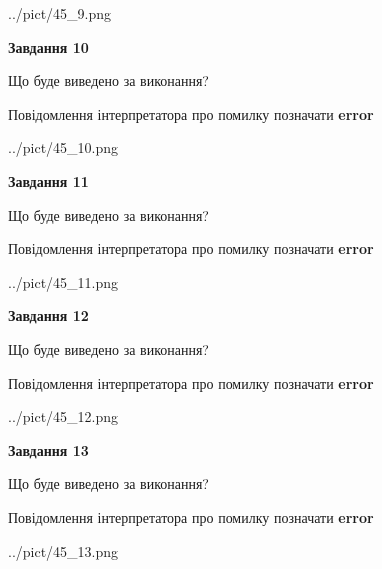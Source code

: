 \documentclass[11pt, ukrainian]{article}
\begin{document}
{\begin {large}
\begin{center}
	{../pict/45_9.png}
\end{center}
\newpage

{\begin {center}\textbf{Завдання 10}\end {center}}\par
Що буде виведено за виконання? \par
Повідомлення інтерпретатора про помилку позначати \textbf{error}

\begin{center}
	{../pict/45_10.png}
\end{center}
\newpage

{\begin {center}\textbf{Завдання 11}\end {center}}\par
Що буде виведено за виконання? \par
Повідомлення інтерпретатора про помилку позначати \textbf{error}

\begin{center}
	{../pict/45_11.png}
\end{center}
\newpage

{\begin {center}\textbf{Завдання 12}\end {center}}\par
Що буде виведено за виконання? \par
Повідомлення інтерпретатора про помилку позначати \textbf{error}

\begin{center}
	{../pict/45_12.png}
\end{center}
\newpage

{\begin {center}\textbf{Завдання 13}\end {center}}\par
Що буде виведено за виконання? \par
Повідомлення інтерпретатора про помилку позначати \textbf{error}

\begin{center}
	{../pict/45_13.png}
\end{center}
\newpage


\end{large}}
\end{document}
